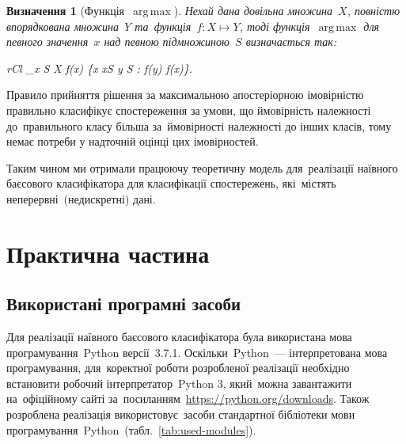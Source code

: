 \documentclass[
	a4paper,
	oneside,
	DIV = 12,
	fontsize = 13pt,
	headings = normal,
	numbers = endperiod,
	bibliography = totoc, %
]{scrartcl}
\theoremstyle{mythm}
\newtheorem{mydef}{Визначення}
\newcommand{\filename}[1]{\texttt{#1}}
\newcommand{\modulename}[1]{\texttt{#1}}
\DeclareMathOperator*{\argmax}{arg\,max} %
\begin{document}
			\begin{mydef}[Функція~$\argmax$]
				\label{def:argmax}
				Нехай дана довільна множина~$X$, повністю впорядкована множина~$Y$ та~функція~$f \colon X \mapsto Y$, тоді функція~$\argmax$ для певного значення~$x$ над певною підмножиною~$S$ визначається так:
				\begin{IEEEeqnarray}{rCl}
					\label{eq:argmax}
					\argmax_{x \in S \subseteq X} f(x) \coloneq \{x \mid x\in S \wedge \forall y \in S : f(y) \leqslant f(x)\}.
				\end{IEEEeqnarray}
			\end{mydef}

			Правило прийняття рішення за максимальною апостеріорною імовірністю правильно класифікує спостереження за умови, що ймовірність належності до~правильного класу більша за~ймовірності належності до інших класів, тому немає потреби у надточній оцінці цих імовірностей. 

			Таким чином ми отримали працюючу теоретичну модель для~реалізації наївного баєсового класифікатора для класифікації спостережень, які~містять неперервні~(недискретні) дані.

	\newpage
	\section{Практична частина}

		\subsection{Використані програмні засоби}
			Для реалізації наївного баєсового класифікатора була використана мова програмування~\textenglish{Python} версії~3.7.1. Оскільки~\textenglish{Python}~— інтерпретована мова програмування, для~коректної роботи розробленої реалізації необхідно встановити робочий інтерпретатор~\textenglish{Python 3}, який~можна завантажити на~офіційному сайті за~посиланням~\url{https://python.org/downloads}. Також розроблена реалізація використовує~засоби стандартної бібліотеки мови програмування~\textenglish{Python}~(табл.~\ref{tab:used-modules}).
			
\end{document}
